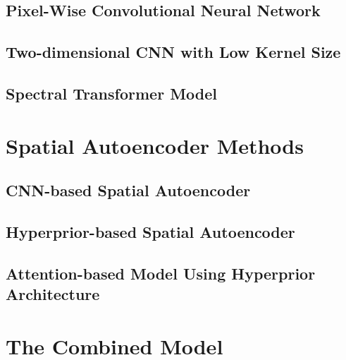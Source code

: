 \subsection{Pixel-Wise Convolutional Neural Network\label{sec:ch3xxx}}

\subsection{Two-dimensional CNN with Low Kernel Size\label{sec:ch3yyy}}

\subsection{Spectral Transformer Model}

\section{Spatial Autoencoder Methods\label{sec:ch3zzz}}

\subsection{CNN-based Spatial Autoencoder}

\subsection{Hyperprior-based Spatial Autoencoder}

\subsection{Attention-based Model Using Hyperprior Architecture}

\section{The Combined Model}